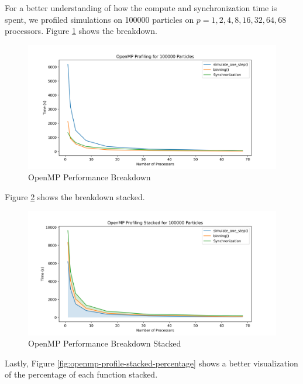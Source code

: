 \documentclass{article}
\begin{document}
For a better understanding of how the compute and synchronization time is spent, we profiled simulations on 100000 particles on $p = {1, 2, 4, 8, 16, 32, 64, 68}$ processors. Figure \ref{fig:openmp-profile} shows the breakdown.

\begin{figure}[H]
\centering
\includegraphics[width=6in]{figures/openmp_profiling.png}
\caption{OpenMP Performance Breakdown}
\label{fig:openmp-profile}
\end{figure}

Figure \ref{fig:openmp-profile-stacked} shows the breakdown stacked.

\begin{figure}[H]
\centering
\includegraphics[width=6in]{figures/openmp_profiling_stacked.png}
\caption{OpenMP Performance Breakdown Stacked}
\label{fig:openmp-profile-stacked}
\end{figure}

Lastly, Figure \ref{fig:openmp-profile-stacked-percentage} shows a better visualization of the percentage of each function stacked. 
\end{document}
